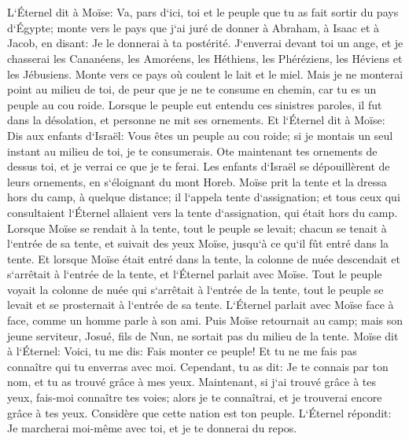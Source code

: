 \chapter{}

\verse L`Éternel dit à Moïse: Va, pars d`ici, toi et le peuple que tu as fait sortir du pays d`Égypte; monte vers le pays que j`ai juré de donner à Abraham, à Isaac et à Jacob, en disant: Je le donnerai à ta postérité. 
\verse J`enverrai devant toi un ange, et je chasserai les Cananéens, les Amoréens, les Héthiens, les Phéréziens, les Héviens et les Jébusiens. 
\verse Monte vers ce pays où coulent le lait et le miel. Mais je ne monterai point au milieu de toi, de peur que je ne te consume en chemin, car tu es un peuple au cou roide. 
\verse Lorsque le peuple eut entendu ces sinistres paroles, il fut dans la désolation, et personne ne mit ses ornements. 
\verse Et l`Éternel dit à Moïse: Dis aux enfants d`Israël: Vous êtes un peuple au cou roide; si je montais un seul instant au milieu de toi, je te consumerais. Ote maintenant tes ornements de dessus toi, et je verrai ce que je te ferai. 
\verse Les enfants d`Israël se dépouillèrent de leurs ornements, en s`éloignant du mont Horeb. 
\verse Moïse prit la tente et la dressa hors du camp, à quelque distance; il l`appela tente d`assignation; et tous ceux qui consultaient l`Éternel allaient vers la tente d`assignation, qui était hors du camp. 
\verse Lorsque Moïse se rendait à la tente, tout le peuple se levait; chacun se tenait à l`entrée de sa tente, et suivait des yeux Moïse, jusqu`à ce qu`il fût entré dans la tente. 
\verse Et lorsque Moïse était entré dans la tente, la colonne de nuée descendait et s`arrêtait à l`entrée de la tente, et l`Éternel parlait avec Moïse. 
\verse Tout le peuple voyait la colonne de nuée qui s`arrêtait à l`entrée de la tente, tout le peuple se levait et se prosternait à l`entrée de sa tente. 
\verse L`Éternel parlait avec Moïse face à face, comme un homme parle à son ami. Puis Moïse retournait au camp; mais son jeune serviteur, Josué, fils de Nun, ne sortait pas du milieu de la tente. 
\verse Moïse dit à l`Éternel: Voici, tu me dis: Fais monter ce peuple! Et tu ne me fais pas connaître qui tu enverras avec moi. Cependant, tu as dit: Je te connais par ton nom, et tu as trouvé grâce à mes yeux. 
\verse Maintenant, si j`ai trouvé grâce à tes yeux, fais-moi connaître tes voies; alors je te connaîtrai, et je trouverai encore grâce à tes yeux. Considère que cette nation est ton peuple. 
\verse L`Éternel répondit: Je marcherai moi-même avec toi, et je te donnerai du repos. 

